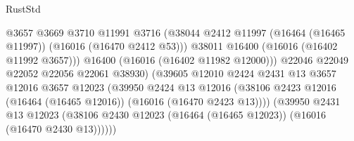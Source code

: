 \begin{lexlean}{RustStd}
\begin{coremodule}
                                              @3657
                                              @3669
                                              @3710
                                              @11991
                                              @3716
                                              (@38044
                                                @2412
                                                @11997
                                                (@16464 (@16465 @11997))
                                                (@16016 (@16470 @2412 @53)))
                                              @38011
                                              @16400
                                              (@16016 (@16402 @11992 @3657)))
                                            @16400
                                            (@16016 (@16402 @11982 @12000)))
                                          @22046
                                          @22049
                                          @22052
                                          @22056
                                          @22061
                                          @38930)
                                        (@39605
                                          @12010
                                          @2424
                                          @2431
                                          @13
                                          @3657
                                          @12016
                                          @3657
                                          @12023
                                          (@39950
                                            @2424
                                            @13
                                            @12016
                                            (@38106
                                              @2423
                                              @12016
                                              (@16464 (@16465 @12016))
                                              (@16016 (@16470 @2423 @13))))
                                          (@39950
                                            @2431
                                            @13
                                            @12023
                                            (@38106
                                              @2430
                                              @12023
                                              (@16464 (@16465 @12023))
                                              (@16016 (@16470 @2430 @13))))))

\end{coremodule}
\end{lexlean}
